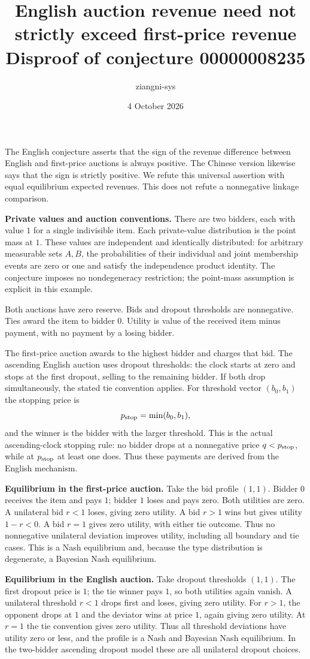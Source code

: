 \documentclass[11pt]{article}
\title{English auction revenue need not strictly exceed first-price revenue\\
\large Disproof of conjecture 00000008235}
\author{ziangni-sys}
\date{4 October 2026}
\begin{document}
\maketitle
The English conjecture asserts that the sign of the revenue difference
between English and first-price auctions is always positive. The Chinese
version likewise says that the sign is strictly positive. We refute this
universal assertion with equal equilibrium expected revenues. This does
not refute a nonnegative linkage comparison.

\textbf{Private values and auction conventions.}
There are two bidders, each with value $1$ for a single indivisible item.
Each private-value distribution is the point mass at $1$. These values
are independent and identically distributed: for arbitrary measurable
sets $A,B$, the probabilities of their individual and joint membership
events are zero or one and satisfy the independence product identity.
The conjecture imposes no nondegeneracy restriction; the point-mass
assumption is explicit in this example.

Both auctions have zero reserve. Bids and dropout thresholds are
nonnegative. Ties award the item to bidder $0$. Utility is value of the
received item minus payment, with no payment by a losing bidder.

The first-price auction awards to the highest bidder and charges that
bid. The ascending English auction uses dropout thresholds: the clock
starts at zero and stops at the first dropout, selling to the remaining
bidder. If both drop simultaneously, the stated tie convention applies.
For threshold vector $(b_0,b_1)$ the stopping price is
\[
 p_{\rm stop}=\min(b_0,b_1),
\]
and the winner is the bidder with the larger threshold. This is the actual
ascending-clock stopping rule: no bidder drops at a nonnegative price
$q<p_{\rm stop}$, while at $p_{\rm stop}$ at least one does. Thus these
payments are derived from the English mechanism.

\textbf{Equilibrium in the first-price auction.}
Take the bid profile $(1,1)$. Bidder $0$ receives the item and pays $1$;
bidder $1$ loses and pays zero. Both utilities are zero.
A unilateral bid $r<1$ loses, giving zero utility. A bid $r>1$ wins but
gives utility $1-r<0$. A bid $r=1$ gives zero utility, with either tie outcome.
Thus no nonnegative unilateral deviation improves utility, including
all boundary and tie cases. This is a Nash equilibrium and, because
the type distribution is degenerate, a Bayesian Nash equilibrium.

\newpage
\textbf{Equilibrium in the English auction.}
Take dropout thresholds $(1,1)$. The first dropout price is $1$; the
tie winner pays $1$, so both utilities again vanish.
A unilateral threshold $r<1$ drops first and loses, giving zero utility.
For $r>1$, the opponent drops at $1$ and the deviator wins at price $1$,
again giving zero utility. At $r=1$ the tie convention gives zero utility.
Thus all threshold deviations have utility zero or less, and the profile
is a Nash and Bayesian Nash equilibrium. In the two-bidder ascending
dropout model these are all unilateral dropout choices.
\end{document}

